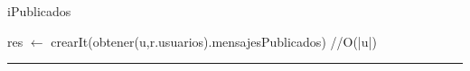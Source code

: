 \begin{algorithm}[H]
\caption{iPublicados}
\begin{algorithmic}[1]
\state res $\gets$ crearIt(obtener(u,r.usuarios).mensajesPublicados) \hfill//O(|u|)
\EndFunction 
\end{algorithmic}
\hrule
{}
\end{algorithm}

